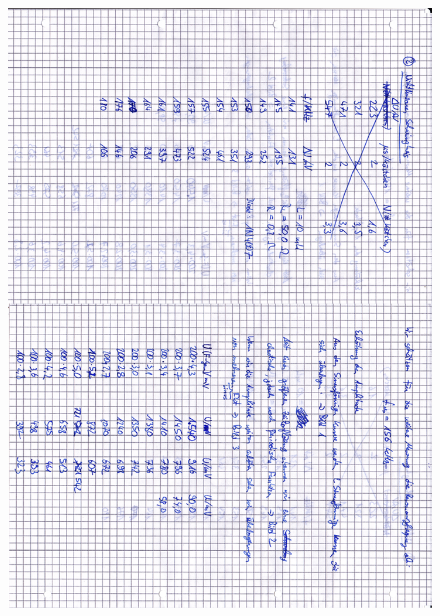 \begin{appendix}
\begin{figure}[H]
\centering \includegraphics[width=\textwidth]{Bilder/anh2.png}
\end{figure}


\end{appendix}
